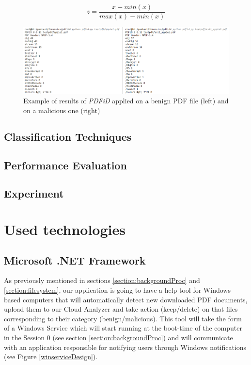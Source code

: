 
\begin{equation}
	\label{eq:1}
	z = \frac{x - min(x)}{max(x) - min(x)}
\end{equation}

\begin{figure}[H]
	\centerline{\includegraphics[scale=0.6]{figures/pdfidoutput.png}}  
	\caption{Example of results of \textit{PDFiD} applied on a benign PDF file (left) and on a malicious one (right)}
	\label{pdfidoutput}
\end{figure}

\subsection{Classification Techniques}
\subsection{Performance Evaluation}
\subsection{Experiment}     %
\cite{zeltser}

\section{Used technologies}
\label{section:technologies}
\subsection{Microsoft .NET Framework}
As previously mentioned in sections \ref{section:backgroundProc} and \ref{section:filesystem}, our application is going to have a help tool for Windows based computers that will automatically detect new downloaded PDF documents, upload them to our Cloud Analyzer and take action (keep/delete) on that files corresponding to their category (benign/malicious). This tool will take the form of a Windows Service which will start running at the boot-time of the computer in the Session 0 (see section \ref{section:backgroundProc}) and will communicate with an application responsible for notifying users through Windows notifications (see Figure \ref{winserviceDesign}). 

